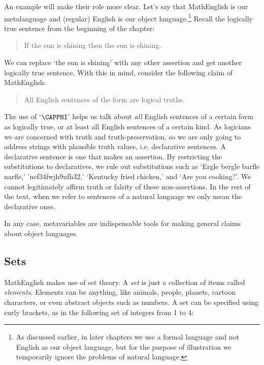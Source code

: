 An example will make their role more clear.  Let's say that MathEnglish is our metalanguage and (regular) English is our object language.\footnote{As discussed earlier, in later chapters we use a formal language and not English as our object language, but for the purpose of illustration we temporarily ignore the problems of natural language.}  Recall the logically true sentence from the beginning of the chapter:

\begin{quote}
\noindent{}If the sun is shining then the sun is shining.
\end{quote}

\noindent{}We can replace `the sun is shining' with any other assertion and get another logically true sentence.  With this in mind, consider the following claim of MathEnglish: 

\noindent{}\begin{quote}All English sentences of the form  are logical truths.\end{quote}

\noindent{}The use of `$\CAPPHI$' helps us talk about \emph{all} English sentences of a certain form as logically true, or at least all English sentences of a certain kind. 
As logicians we are concerned with truth and truth-preservation, so we are only going to address strings with plausible truth values, i.e. declarative sentences. 
A declarative sentence is one that makes an assertion. 
By restricting the substitutions to declaratives, we rule out substitutions such as `Ergle bergle barfle narfle,' 'nef34fwjh9ufh32,' `Kentucky fried chicken,' and `Are you cooking?'. 
We cannot legitimately affirm truth or falsity of these non-assertions. 
In the rest of the text, when we refer to  sentences of a natural language we only mean the declarative ones.

In any case, metavariables are indispensable tools for making general claims about object languages.


\subsection{Sets}\label{sets}

MathEnglish makes use of set theory.  A \emph{set} is just a collection of items called \emph{elements}. Elements can be anything, like animals, people, planets, cartoon characters, or even abstract objects such as numbers.  A set can be specified using curly brackets, as in the following set of integers from 1 to 4:

